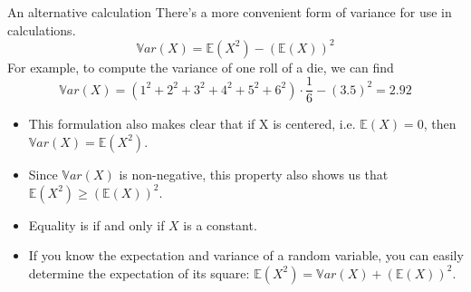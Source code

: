 \documentclass[aspectratio=169]{../latex_main/tntbeamer}  %
\begin{document}
	
	
	
	
	\begin{frame}[c]{An alternative calculation}
	There’s a more convenient form of variance for use in calculations.
	    \begin{equation*}
	        \mathbb{V}ar(X) = \mathbb{E}(X^2) - (\mathbb{E}(X))^2
	    \end{equation*}
	    For example, to compute the variance of one roll of a die, we can find
	    \begin{equation*}
	        \mathbb{V}ar(X)= (1^2+2^2+3^2+4^2+5^2+6^2)\cdot \frac{1}{6}-(3.5)^2 = 2.92
	    \end{equation*}
	    
	    \begin{itemize}
	        \item This formulation also makes clear that if X is centered, i.e. $\mathbb{E}(X) = 0$, then $\mathbb{V}ar(X) = \mathbb{E}(X^2)$.
	        \item Since $\mathbb{V}ar(X)$ is non-negative, this property also shows us that $\mathbb{E}(X^2) \geq (\mathbb{E}(X))^2$.
	        \item Equality is if and only if $X$ is a constant.
	        \item If you know the expectation and variance of a random variable, you can easily determine the expectation of its square:   $\mathbb{E}(X^2) = \mathbb{V}ar(X) + (\mathbb{E}(X))^2$. 
	    \end{itemize}
	\end{frame}
	
\end{document}
